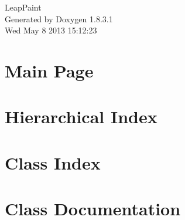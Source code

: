 \documentclass{article}
\begin{document}
\hypersetup{pageanchor=false,citecolor=blue}
\begin{titlepage}
\vspace*{7cm}
\begin{center}
{\Large Leap\-Paint }\\
\vspace*{1cm}
{\large Generated by Doxygen 1.8.3.1}\\
\vspace*{0.5cm}
{\small Wed May 8 2013 15:12:23}\\
\end{center}
\end{titlepage}
\tableofcontents
{}
\hypersetup{pageanchor=true,citecolor=blue}
\section{Main Page}
\label{index}\hypertarget{index}{}
\section{Hierarchical Index}

\section{Class Index}

\section{Class Documentation}




























\printindex
\end{document}
